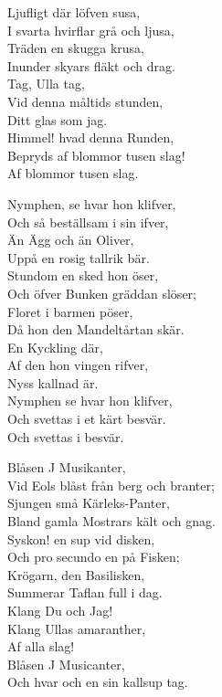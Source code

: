 Ljufligt där löfven susa,\\ 
I svarta hvirflar grå och ljusa,\\ 
Träden en skugga krusa,\\ 
Inunder skyars fläkt och drag.\\ 
Tag, Ulla tag,\\ 
Vid denna måltids stunden,\\ 
Ditt glas som jag.\\ 
Himmel! hvad denna Runden,\\ 
Bepryds af blommor tusen slag!\\ 
Af blommor tusen slag.\par
\vspace{10pt}
Nymphen, se hvar hon klifver,\\ 
Och så beställsam i sin ifver,\\ 
Än Ägg och än Oliver,\\ 
Uppå en rosig tallrik bär.\\ 
Stundom en sked hon öser,\\ 
Och öfver Bunken gräddan slöser;\\ 
Floret i barmen pöser,\\ 
Då hon den Mandeltårtan skär.\\ 
En Kyckling där,\\ 
Af den hon vingen rifver,\\ 
Nyss kallnad är.\\ 
Nymphen se hvar hon klifver,\\ 
Och svettas i et kärt besvär.\\ 
Och svettas i besvär.\par
\vspace{10pt}
Blåsen J Musikanter,\\ 
Vid Eols blåst från berg och branter;\\ 
Sjungen små Kärleks-Panter,\\ 
Bland gamla Mostrars kält och gnag.\\ 
Syskon! en sup vid disken,\\ 
Och pro secundo en på Fisken;\\ 
Krögarn, den Basilisken,\\ 
Summerar Taflan full i dag.\\ 
Klang Du och Jag!\\ 
Klang Ullas amaranther,\\ 
Af alla slag!\\ 
Blåsen J Musicanter,\\ 
Och hvar och en sin kallsup tag.\\ 
